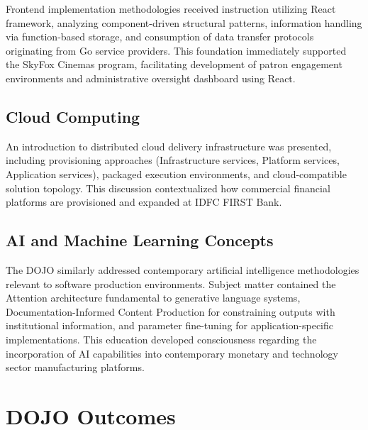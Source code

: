 Frontend implementation methodologies received instruction utilizing React framework, 
analyzing component-driven structural patterns, information handling via function-based 
storage, and consumption of data transfer protocols originating from Go service providers. 
This foundation immediately supported the SkyFox Cinemas program, facilitating development 
of patron engagement environments and administrative oversight dashboard using React.

\subsection{Cloud Computing}

An introduction to distributed cloud delivery infrastructure was presented, including 
provisioning approaches (Infrastructure services, Platform services, Application services), 
packaged execution environments, and cloud-compatible solution topology. This discussion 
contextualized how commercial financial platforms are provisioned and expanded at IDFC 
FIRST Bank.

\subsection{AI and Machine Learning Concepts}

The DOJO similarly addressed contemporary artificial intelligence methodologies relevant 
to software production environments. Subject matter contained the Attention architecture 
fundamental to generative language systems, Documentation-Informed Content Production 
for constraining outputs with institutional information, and parameter fine-tuning for 
application-specific implementations. This education developed consciousness regarding 
the incorporation of AI capabilities into contemporary monetary and technology sector 
manufacturing platforms.

\section{DOJO Outcomes}

